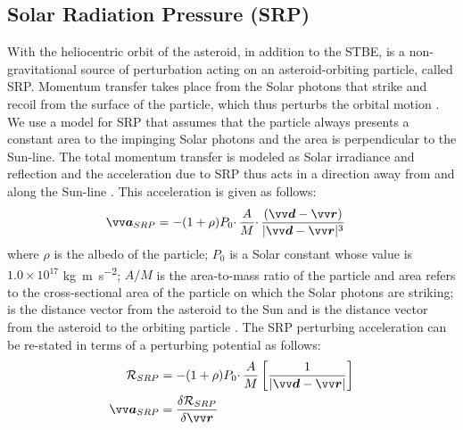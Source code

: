 \subsection{Solar Radiation Pressure (SRP)}
\label{subsec:srp}
With the heliocentric orbit of the asteroid, in addition to the \gls{STBE}, is a non-gravitational source of perturbation acting on an asteroid-orbiting particle, called \gls{SRP}. Momentum transfer takes place from the Solar photons that strike and recoil from the surface of the particle, which thus perturbs the orbital motion \parencite{scheeresBook}.
%
\newline\newline
%
We use a model for \gls{SRP} that assumes that the particle always presents a constant area to the impinging Solar photons and the area is perpendicular to the Sun-line. The total momentum transfer is modeled as Solar irradiance and reflection and the acceleration due to \gls{SRP} thus acts in a direction away from and along the Sun-line \parencite{scheeresBook}. This acceleration is given as follows:
\begin{align}
    \bv{a}_{SRP} &= -(1 + \rho) P_0 \cdotp \frac{A}{M} \cdotp \frac{(\bv{d} - \bv{r})}{|\bv{d} - \bv{r}|^3}
    \label{eqn:srp_acc}
\end{align}
where $\rho$ is the albedo of the particle; $P_0$ is a Solar constant whose value is $1.0\times10^{17}$ \si{\kilogram \metre \per \second \squared}; $A/M$ is the area-to-mass ratio of the particle and area refers to the cross-sectional area of the particle on which the Solar photons are striking;  is the distance vector from the asteroid to the Sun and  is the distance vector from the asteroid to the orbiting particle \parencite{scheeresBook}. The \gls{SRP} perturbing acceleration can be re-stated in terms of a perturbing potential as follows:
\begin{align}
    \mathcal{R}_{SRP} &= -(1 + \rho) P_0 \cdotp \frac{A}{M} \left[\frac{1}{|\bv{d}-\bv{r}|}\right]
    \label{eqn:srp_potential} \\
    \bv{a}_{SRP} &= \frac{\delta \mathcal{R}_{SRP}}{\delta \bv{r}}
\end{align}

